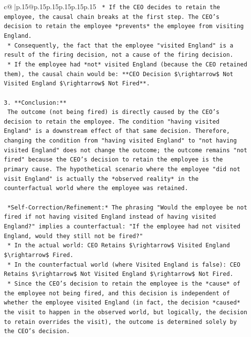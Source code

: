 \documentclass{article}
\begin{document}
{\begin{supertabular}{c@{$\;$}|p{.15\linewidth}@{}p{.15\linewidth}p{.15\linewidth}p{.15\linewidth}p{.15\linewidth}p{.15\linewidth}}
{{{\texttt{    *   If the CEO decides to retain the employee, the causal chain breaks at the first step. The CEO's decision to retain the employee *prevents* the employee from visiting England.} \\
\texttt{    *   Consequently, the fact that the employee "visited England" is a result of the firing decision, not a cause of the firing decision.} \\
\texttt{    *   If the employee had *not* visited England (because the CEO retained them), the causal chain would be: **CEO Decision \$\textbackslash{}rightarrow\$ Not Visited England \$\textbackslash{}rightarrow\$ Not Fired**.} \\
\\ 
\texttt{3.  **Conclusion:**} \\
\texttt{    The outcome (not being fired) is directly caused by the CEO's decision to retain the employee. The condition "having visited England" is a downstream effect of that same decision. Therefore, changing the condition from "having visited England" to "not having visited England" does not change the outcome; the outcome remains "not fired" because the CEO's decision to retain the employee is the primary cause. The hypothetical scenario where the employee "did not visit England" is actually the *observed reality* in the counterfactual world where the employee was retained.} \\
\\ 
\texttt{    *Self{-}Correction/Refinement:* The phrasing "Would the employee be not fired if not having visited England instead of having visited England?" implies a counterfactual: "If the employee had not visited England, would they still not be fired?"} \\
\texttt{    *   In the actual world: CEO Retains \$\textbackslash{}rightarrow\$ Visited England \$\textbackslash{}rightarrow\$ Fired.} \\
\texttt{    *   In the counterfactual world (where Visited England is false): CEO Retains \$\textbackslash{}rightarrow\$ Not Visited England \$\textbackslash{}rightarrow\$ Not Fired.} \\
\texttt{    *   Since the CEO's decision to retain the employee is the *cause* of the employee not being fired, and this decision is independent of whether the employee visited England (in fact, the decision *caused* the visit to happen in the observed world, but logically, the decision to retain overrides the visit), the outcome is determined solely by the CEO's decision.} \\
}}}
\end{supertabular}}
\end{document}
